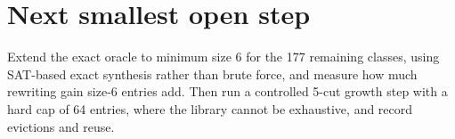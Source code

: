 \documentclass[11pt]{article}
\begin{document}
\section{Next smallest open step}
Extend the exact oracle to minimum size 6 for the 177 remaining classes, using SAT-based exact synthesis rather than brute force, and measure how much rewriting gain size-6 entries add. Then run a controlled 5-cut growth step with a hard cap of 64 entries, where the library cannot be exhaustive, and record evictions and reuse.

\end{document}
